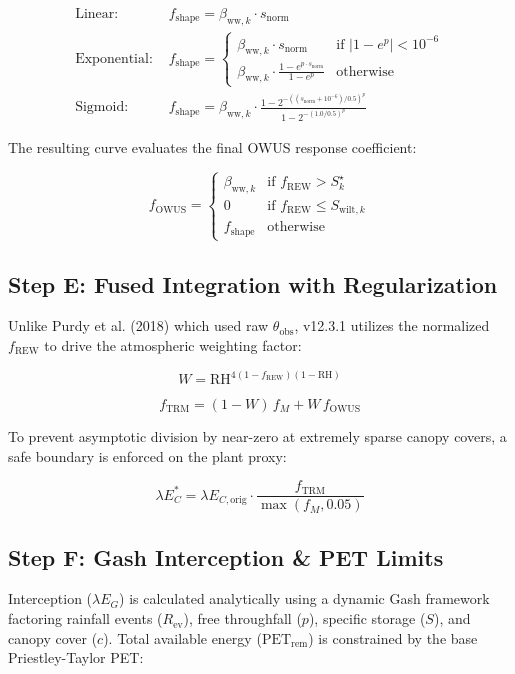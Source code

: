 \documentclass[11pt]{article}
\begin{document}
$$\begin{aligned} \text{Linear: } & f_{\mathrm{shape}} = \beta_{\mathrm{ww},k} \cdot s_{\mathrm{norm}} \\ \text{Exponential: } & f_{\mathrm{shape}} = \begin{cases} \beta_{\mathrm{ww},k} \cdot s_{\mathrm{norm}} & \text{if } |1 - e^p| < 10^{-6} \\ \beta_{\mathrm{ww},k} \cdot \frac{1 - e^{p \cdot s_{\mathrm{norm}}}}{1 - e^p} & \text{otherwise} \end{cases} \\ \text{Sigmoid: } & f_{\mathrm{shape}} = \beta_{\mathrm{ww},k} \cdot \frac{1 - 2^{-((s_{\mathrm{norm}} + 10^{-6})/0.5)^p}}{1 - 2^{-(1.0/0.5)^p}} \end{aligned}$$

The resulting curve evaluates the final OWUS response coefficient:


$$f_{\mathrm{OWUS}} = \begin{cases} \beta_{\mathrm{ww},k} & \text{if } f_{\mathrm{REW}} > S^\star_{k} \\ 0 & \text{if } f_{\mathrm{REW}} \le S_{\mathrm{wilt},k} \\ f_{\mathrm{shape}} & \text{otherwise} \end{cases}$$

\subsection*{Step E: Fused Integration with Regularization}

Unlike Purdy et al. (2018) which used raw $\theta_{\mathrm{obs}}$, v12.3.1 utilizes the normalized $f_{\mathrm{REW}}$ to drive the atmospheric weighting factor:


$$W = \mathrm{RH}^{4(1-f_{\mathrm{REW}})(1-\mathrm{RH})}$$

$$f_{\mathrm{TRM}} = (1-W)\,f_{M} + W\,f_{\mathrm{OWUS}}$$

To prevent asymptotic division by near-zero at extremely sparse canopy covers, a safe boundary is enforced on the plant proxy:


$$\lambda E_{C}^{\ast} = \lambda E_{C,\mathrm{orig}} \cdot \frac{f_{\mathrm{TRM}}}{\max(f_{M}, 0.05)}$$

\subsection*{Step F: Gash Interception \& PET Limits}

Interception ($\lambda E_G$) is calculated analytically using a dynamic Gash framework factoring rainfall events ($R_{\mathrm{ev}}$), free throughfall ($p$), specific storage ($S$), and canopy cover ($c$). Total available energy ($\mathrm{PET}_{\mathrm{rem}}$) is constrained by the base Priestley-Taylor PET:
\end{document}
